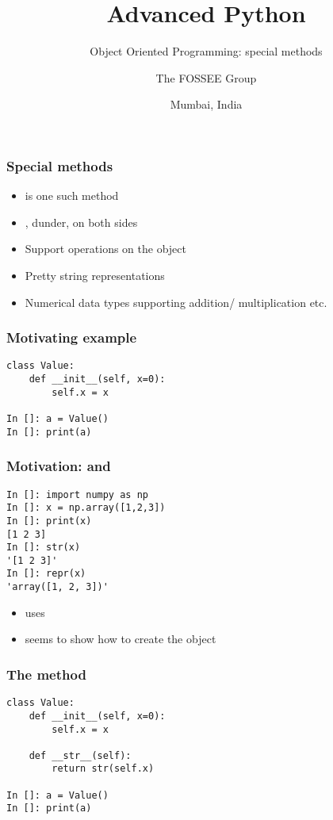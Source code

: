 \documentclass[14pt,compress,aspectratio=169]{beamer}
\title[OOP: special methods]{Advanced Python}
\subtitle{Object Oriented Programming: special methods}
\author[FOSSEE] {The FOSSEE Group}
\institute[IIT Bombay] {Department of Aerospace Engineering\\IIT Bombay}
\date[] {Mumbai, India}
\begin{document}
\begin{frame}
  \titlepage
\end{frame}

\begin{frame}
  \frametitle{Special methods}
  \begin{itemize}
  \item {} is one such method
  \item \py{__}, dunder, on both sides
  \item Support operations on the object
  \item Pretty string representations
  \item Numerical data types supporting addition/ multiplication etc.
  \end{itemize}
\end{frame}

\begin{frame}[fragile]
  \frametitle{Motivating example}
\begin{lstlisting}
class Value:
    def __init__(self, x=0):
        self.x = x

In []: a = Value()
In []: print(a)
\end{lstlisting}
\end{frame}

\begin{frame}[fragile]
  \frametitle{Motivation:  and }
\begin{lstlisting}
In []: import numpy as np
In []: x = np.array([1,2,3])
In []: print(x)
[1 2 3]
In []: str(x)
'[1 2 3]'
In []: repr(x)
'array([1, 2, 3])'
\end{lstlisting}
  \begin{itemize}
  \item {} uses 
  \item {} seems to show how to create the object
  \end{itemize}
\end{frame}

\begin{frame}[fragile]
  \frametitle{The  method}
\begin{lstlisting}
class Value:
    def __init__(self, x=0):
        self.x = x

    def __str__(self):
        return str(self.x)

In []: a = Value()
In []: print(a)

\end{lstlisting}
\end{frame}
\end{document}
